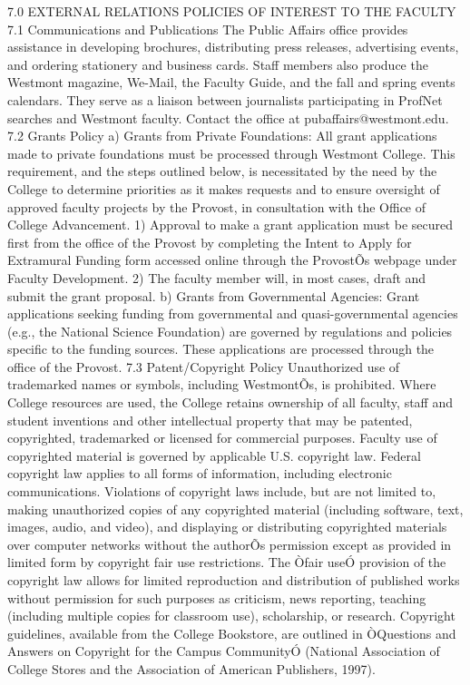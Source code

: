 \documentclass[letterpaper, 11pt]{article}
\begin{document}
7.0 EXTERNAL RELATIONS POLICIES OF INTEREST TO THE FACULTY
7.1 Communications and Publications
   The Public Affairs office provides assistance in developing brochures, distributing press releases, advertising events, and ordering stationery and business cards. Staff members also produce the Westmont magazine, We-Mail, the Faculty Guide, and the fall and spring events calendars.  They serve as a liaison between journalists participating in ProfNet searches and Westmont faculty. Contact the office at pubaffairs@westmont.edu.
7.2 Grants Policy
a) Grants from Private Foundations:  All grant applications made to private foundations must be processed through Westmont College.  This requirement, and the steps outlined below, is necessitated by the need by the College to determine priorities as it makes requests and to ensure oversight of approved faculty projects by the Provost, in consultation with the Office of College Advancement.
1) Approval to make a grant application must be secured first from the office of the Provost by completing the Intent to Apply for Extramural Funding form accessed online through the ProvostÕs webpage under Faculty Development.
2)  The faculty member will, in most cases, draft and submit the grant proposal.
b) Grants from Governmental Agencies:  Grant applications seeking funding from governmental and quasi-governmental agencies (e.g., the National Science Foundation) are governed by regulations and policies specific to the funding sources. These applications are processed through the office of the Provost.
7.3 Patent/Copyright Policy
   Unauthorized use of trademarked names or symbols, including WestmontÕs, is prohibited.  Where College resources are used, the College retains ownership of all faculty, staff and student inventions and other intellectual property that may be patented, copyrighted, trademarked or licensed for commercial purposes.
   Faculty use of copyrighted material is governed by applicable U.S. copyright law.  Federal copyright law applies to all forms of information, including electronic communications.  Violations of copyright laws include, but are not limited to, making unauthorized copies of any copyrighted material (including software, text, images, audio, and video), and displaying or distributing copyrighted materials over computer networks without the authorÕs permission except as provided in limited form by copyright fair use restrictions.  The Òfair useÓ provision of the copyright law allows for limited reproduction and distribution of published works without permission for such purposes as criticism, news reporting, teaching (including multiple copies for classroom use), scholarship, or research.  Copyright guidelines, available from the College Bookstore, are outlined in ÒQuestions and Answers on Copyright for the Campus CommunityÓ (National Association of College Stores and the Association of American Publishers, 1997).
\end{document}
